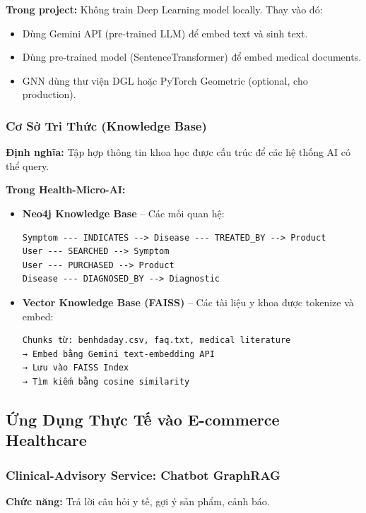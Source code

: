 \documentclass[12pt,a4paper]{article}
\begin{document}
\textbf{Trong project:} Không train Deep Learning model locally. Thay vào đó:
\begin{itemize}
    \item Dùng Gemini API (pre-trained LLM) để embed text và sinh text.
    \item Dùng pre-trained model (SentenceTransformer) để embed medical documents.
    \item GNN dùng thư viện DGL hoặc PyTorch Geometric (optional, cho production).
\end{itemize}

\subsubsection{Cơ Sở Tri Thức (Knowledge Base)}

\textbf{Định nghĩa:} Tập hợp thông tin khoa học được cấu trúc để các hệ thống AI có thể query.

\textbf{Trong Health-Micro-AI:}
\begin{itemize}
    \item \textbf{Neo4j Knowledge Base} – Các mối quan hệ:
    \begin{verbatim}
Symptom --- INDICATES --> Disease --- TREATED_BY --> Product
User --- SEARCHED --> Symptom
User --- PURCHASED --> Product
Disease --- DIAGNOSED_BY --> Diagnostic
    \end{verbatim}
    
    \item \textbf{Vector Knowledge Base (FAISS)} – Các tài liệu y khoa được tokenize và embed:
    \begin{verbatim}
Chunks từ: benhdaday.csv, faq.txt, medical literature
→ Embed bằng Gemini text-embedding API
→ Lưu vào FAISS Index
→ Tìm kiếm bằng cosine similarity
    \end{verbatim}
\end{itemize}

\subsection{Ứng Dụng Thực Tế vào E-commerce Healthcare}

\subsubsection{Clinical-Advisory Service: Chatbot GraphRAG}

\textbf{Chức năng:} Trả lời câu hỏi y tế, gợi ý sản phẩm, cảnh báo.
\end{document}

